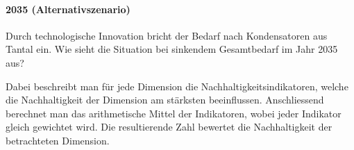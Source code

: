 \paragraph{2035 (Alternativszenario)}
Durch technologische Innovation bricht der Bedarf nach Kondensatoren aus Tantal ein. Wie sieht die Situation bei sinkendem Gesamtbedarf im Jahr 2035 aus?

Dabei beschreibt man für jede Dimension die Nachhaltigkeitsindikatoren, welche die Nachhaltigkeit der Dimension am stärksten beeinflussen. Anschliessend berechnet man das arithmetische Mittel der Indikatoren, wobei jeder Indikator gleich gewichtet wird.
Die resultierende Zahl bewertet die Nachhaltigkeit der betrachteten Dimension.
